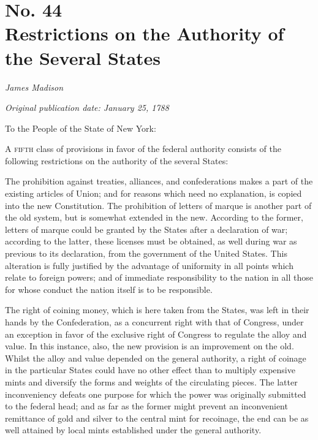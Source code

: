 \chapter[No. 44: Restrictions on the Authority of the Several States]{No. 44\\ {\small Restrictions on the Authority of the Several States}}

\textit{James Madison}

\textit{Original publication date: January 25, 1788}
\vspace{1cm}

To the People of the State of New York:
\vspace{.4cm}

\textsc{A fifth} class of provisions in favor of the federal authority consists of the following restrictions on the authority of the several States:

The prohibition against treaties, alliances, and confederations makes a part of the existing articles of Union; and for reasons which need no explanation, is copied into the new Constitution. 
The prohibition of letters of marque is another part of the old system, but is somewhat extended in the new. 
According to the former, letters of marque could be granted by the States after a declaration of war; according to the latter, these licenses must be obtained, as well during war as previous to its declaration, from the government of the United States. 
This alteration is fully justified by the advantage of uniformity in all points which relate to foreign powers; and of immediate responsibility to the nation in all those for whose conduct the nation itself is to be responsible.

The right of coining money, which is here taken from the States, was left in their hands by the Confederation, as a concurrent right with that of Congress, under an exception in favor of the exclusive right of Congress to regulate the alloy and value. 
In this instance, also, the new provision is an improvement on the old. 
Whilst the alloy and value depended on the general authority, a right of coinage in the particular States could have no other effect than to multiply expensive mints and diversify the forms and weights of the circulating pieces. 
The latter inconveniency defeats one purpose for which the power was originally submitted to the federal head; and as far as the former might prevent an inconvenient remittance of gold and silver to the central mint for recoinage, the end can be as well attained by local mints established under the general authority.

